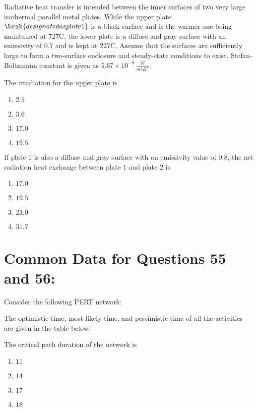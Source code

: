     Radiative heat transfer is intended between the inner surfaces of two very large isothermal parallel metal plates. While the upper plate $\brak{designated as plate 1}$ is a black surface and is the warmer one being maintained at $727 $\degree C, the lower plate  is a diffuse and gray surface with an emissivity of $0.7$ and is kept at $227 $\degree C. Assume that the surfaces are sufficiently large to form a two-surface enclosure and steady-state conditions to exist. Stefan-Boltzmann constant is given as $5.67 \times 10^{-8} \, \frac{W}{{m}^2{K}^4}$.

\item The irradiation  for the upper plate  is


    \begin{enumerate}
        \item $2.5$
        \item $3.6$
        \item $17.0$
        \item $19.5$
    \end{enumerate}

    \item If plate $1$ is also a diffuse and gray surface with an emissivity value of $0.8$, the net radiation heat exchange  between plate $1$ and plate $2$ is
    \begin{enumerate}
        \item $17.0$
        \item $19.5$
        \item $23.0$
        \item $31.7$
    \end{enumerate} 

\section{ Common Data for Questions 55 and 56:}
    
    Consider the following PERT network:
    
   

    The optimistic time, most likely time, and pessimistic time of all the activities are given in the table below:
    
    
    \item The critical path duration of the network  is
    \begin{enumerate}
        \item $11$
        \item $14$
        \item $17$
        \item $18$
    \end{enumerate}

